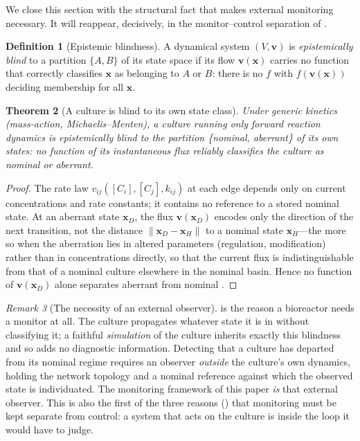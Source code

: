 \documentclass[11pt,twocolumn,a4paper]{article}
\theoremstyle{thmstyle}
\newtheorem{theorem}{Theorem}[section]
\theoremstyle{definition}
\newtheorem{definition}[theorem]{Definition}
\theoremstyle{remark}
\newtheorem{remark}[theorem]{Remark}
\newcommand{\V}{V}
\newcommand{\norm}[1]{\lVert#1\rVert}
\begin{document}
We close this section with the structural fact that makes external
monitoring necessary. It will reappear, decisively, in the
monitor--control separation of .

\begin{definition}[Epistemic blindness]
\label{def:blindness}
A dynamical system $(\V,\mathbf{v})$ is \emph{epistemically blind} to a
partition $\{A,B\}$ of its state space if its flow $\mathbf{v}(\mathbf{x})$
carries no function that correctly classifies $\mathbf{x}$ as belonging to
$A$ or $B$: there is no $f$ with $f(\mathbf{v}(\mathbf{x}))$ deciding
membership for all $\mathbf{x}$.
\end{definition}

\begin{theorem}[A culture is blind to its own state class]
\label{thm:blindness}
Under generic kinetics (mass-action, Michaelis--Menten), a culture running
only forward reaction dynamics is epistemically blind to the partition
\{nominal, aberrant\} of its own states: no function of its instantaneous
flux reliably classifies the culture as nominal or aberrant.
\end{theorem}

\begin{proof}
The rate law $v_{ij}([C_i],[C_j],k_{ij})$ at each edge depends only on
current concentrations and rate constants; it contains no reference to a
stored nominal state. At an aberrant state $\mathbf{x}_D$, the flux
$\mathbf{v}(\mathbf{x}_D)$ encodes only the direction of the next
transition, not the distance $\norm{\mathbf{x}_D-\mathbf{x}_H}$ to a nominal
state $\mathbf{x}_H$---the more so when the aberration lies in altered
parameters (regulation, modification) rather than in concentrations
directly, so that the current flux is indistinguishable from that of a
nominal culture elsewhere in the nominal basin. Hence no function of
$\mathbf{v}(\mathbf{x}_D)$ alone separates aberrant from nominal
\citep{gillespie1977exact,vankampen2007stochastic}.
\end{proof}

\begin{remark}[The necessity of an external observer]
\label{rem:external}
 is the reason a bioreactor needs a monitor at all. The
culture propagates whatever state it is in without classifying it; a
faithful \emph{simulation} of the culture inherits exactly this blindness
and so adds no diagnostic information. Detecting that a culture has departed
from its nominal regime requires an observer \emph{outside} the culture's
own dynamics, holding the network topology and a nominal reference against
which the observed state is individuated. The monitoring framework of this
paper \emph{is} that external observer. This is also the first of the three
reasons () that monitoring must be kept separate from
control: a system that acts on the culture is inside the loop it would have
to judge.
\end{remark}
\end{document}

